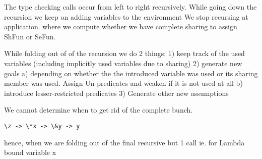 
The type checking calls occur from left to right recursively.
While going down the recursion we keep on adding variables to the environment
We stop recursing at application. where we compute whether we have complete sharing to assign ShFun or SeFun.

While folding out of of the recursion we do 2 things:
1) keep track of the used variables (including implicitly used variables due to sharing)
2) generate new goals
   a) depending on whether the the introduced variable was used
      or its sharing member was used. Assign Un predicates and weaken if it is not used at all
   b) introduce lesser-restricted predicates
3) Generate other new assumptions

We cannot determine when to get rid of the complete bunch.
\begin{verbatim}
\z -> \*x -> \&y -> y
\end{verbatim}
hence, when we are folding out of the final recursive but 1 call ie. for Lambda bound variable x


